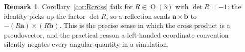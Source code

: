 \documentclass[11pt]{article}
\DeclareMathOperator{\Or}{O}
\newcommand{\vv}[1]{\bm{#1}}
\theoremstyle{plain}
\theoremstyle{definition}
\newtheorem{remark}[theorem]{Remark}
\begin{document}
\begin{remark}
Corollary~\ref{cor:Rcross} fails for $R\in\Or(3)$ with $\det R=-1$: the identity picks up the factor
$\det R$, so a reflection sends $\vv a\times\vv b$ to $-(R\vv a)\times(R\vv b)$. This is the precise
sense in which the cross product is a pseudovector, and the practical reason a left-handed
coordinate convention silently negates every angular quantity in a simulation.
\end{remark}
\end{document}
